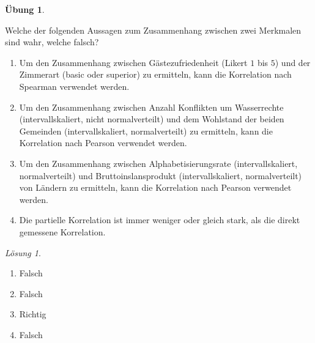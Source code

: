 \documentclass[
]{book}
\providecommand{\tightlist}{%
  \setlength{\itemsep}{0pt}\setlength{\parskip}{0pt}}
\theoremstyle{definition}
\theoremstyle{definition}
\theoremstyle{definition}
\newtheorem{exercise}{Übung}[chapter]
\theoremstyle{definition}
\theoremstyle{remark}
\newtheorem*{solution}{Lösung}
\begin{document}
\begin{exercise}
\protect\hypertarget{exr:test-theorie-korrelation1}{}\label{exr:test-theorie-korrelation1}

Welche der folgenden Aussagen zum Zusammenhang zwischen zwei Merkmalen sind wahr, welche falsch?

\begin{enumerate}
\def\labelenumi{\alph{enumi})}
\tightlist
\item
  Um den Zusammenhang zwischen Gästezufriedenheit (Likert \(1\) bis \(5\)) und der Zimmerart (basic oder superior) zu ermitteln, kann die Korrelation nach Spearman verwendet werden.
\item
  Um den Zusammenhang zwischen Anzahl Konflikten um Wasserrechte (intervallskaliert, nicht normalverteilt) und dem Wohlstand der beiden Gemeinden (intervallskaliert, normalverteilt) zu ermitteln, kann die Korrelation nach Pearson verwendet werden.
\item
  Um den Zusammenhang zwischen Alphabetisierungsrate (intervallskaliert, normalverteilt) und Bruttoinslansprodukt (intervallskaliert, normalverteilt) von Ländern zu ermitteln, kann die Korrelation nach Pearson verwendet werden.
\item
  Die partielle Korrelation ist immer weniger oder gleich stark, als die direkt gemessene Korrelation.
\end{enumerate}

\end{exercise}

\begin{solution}
\leavevmode

\begin{enumerate}
\def\labelenumi{\alph{enumi})}
\tightlist
\item
  Falsch
\item
  Falsch
\item
  Richtig
\item
  Falsch
\end{enumerate}

\end{solution}
\end{document}
